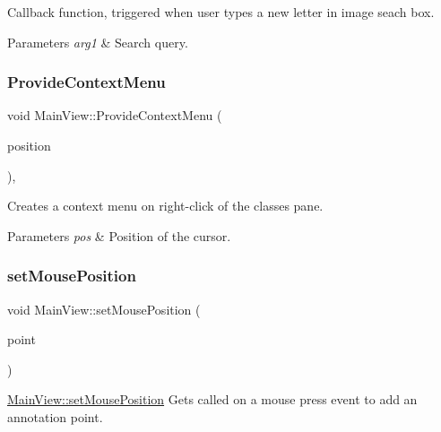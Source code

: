 Callback function, triggered when user types a new letter in image seach box. 


\begin{DoxyParams}{Parameters}
{\em arg1} & Search query. \\
\hline
\end{DoxyParams}
\mbox{\label{classMainView_aa9d5f1300bd6b2524f611873d68c938b}} 
\subsubsection{\texorpdfstring{Provide\+Context\+Menu}{ProvideContextMenu}}
{\footnotesize\ttfamily void Main\+View\+::\+Provide\+Context\+Menu (\begin{DoxyParamCaption}\item[{const Q\+Point \&}]{position }\end{DoxyParamCaption})\hspace{0.3cm}{\ttfamily [private]}, {\ttfamily [slot]}}



Creates a context menu on right-\/click of the classes pane. 


\begin{DoxyParams}{Parameters}
{\em pos} & Position of the cursor. \\
\hline
\end{DoxyParams}
\mbox{\label{classMainView_ac12a2b5c72e5e1f0c924e13258186040}} 
\subsubsection{\texorpdfstring{set\+Mouse\+Position}{setMousePosition}}
{\footnotesize\ttfamily void Main\+View\+::set\+Mouse\+Position (\begin{DoxyParamCaption}\item[{Q\+Point}]{point }\end{DoxyParamCaption})\hspace{0.3cm}{\ttfamily [slot]}}



\hyperlink{classMainView_ac12a2b5c72e5e1f0c924e13258186040}{Main\+View\+::set\+Mouse\+Position} Gets called on a mouse press event to add an annotation point. 


